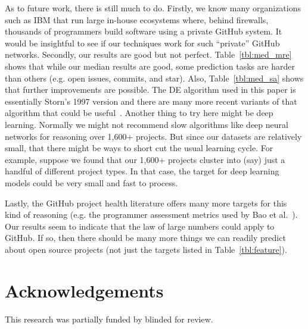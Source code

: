 \documentclass[sigconf,review,anonymous]{acmart}
\newcommand{\tbl}[1]{Table~\ref{tbl:#1}}
\begin{document}
As to future work, there is still much to do. Firstly, we know many organizations such as IBM that run large in-house ecosystems where, behind firewalls, thousands of programmers build software using  a private GitHub system. It would be insightful to see if our techniques work for such ``private'' GitHub networks.
Secondly, our results are good but not perfect. 
Table~\ref{tbl:med_mre} shows that while our median results are good, some prediction tasks are harder than others
(e.g. open issues, commits, and star).
Also, Table~\ref{tbl:med_sa} shows that further improvements are possible. The DE algorithm used in this paper is essentially Storn's 1997 version and there are many more recent variants of that algorithm that could be useful~\cite{wu2018ensemble,das2016recent}. Another thing to try here might be deep learning. Normally we might not recommend slow algorithms like deep neural networks for reasoning over 1,600+ projects. But since our datasets are relatively small, that there might be ways to short cut the usual learning cycle. For example, suppose we found that our 1,600+ projects cluster into (say) just a handful of different project types. In that case, the target for deep learning models could be very small and fast to process.


Lastly, the GitHub project health literature offers many more targets for this kind of reasoning (e.g. the programmer assessment metrics
used by Bao et al.~\cite{bao2019large}).  Our results seem to indicate that   the law of large numbers could apply to GitHub. If so, then there should be many more things we can readily predict about open source  projects (not just the targets listed in \tbl{feature}).

\vspace{3mm}

\section*{Acknowledgements}
This research was partially funded by blinded for review.


\newpage \balance


\end{document}
